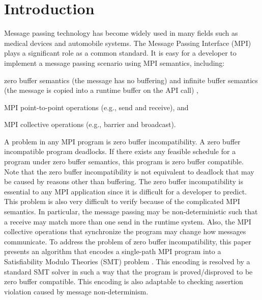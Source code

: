 \section{Introduction}
Message passing technology has become widely used in many fields such as medical devices and automobile systems. The Message Passing Interface (MPI) plays a significant role as a common standard. It is easy for a developer to implement a message passing scenario using MPI semantics, including:

\begin{compactitem}
\item zero buffer semantics (the message has no buffering) and infinite buffer semantics (the message is copied into a runtime buffer on the API call) \cite{DBLP:conf/fm/VakkalankaVGK09},
\item MPI point-to-point operations (e.g., send and receive), and
\item MPI collective operations (e.g., barrier and broadcast).
\end{compactitem}

A problem in any MPI program is zero buffer incompatibility. A zero buffer incompatible program deadlocks. If there exists any feasible schedule for a program under zero buffer semantics, this program is zero buffer compatible. Note that the zero buffer incompatibility is not equivalent to deadlock that may be caused by reasons other than buffering. The zero buffer incompatibility is essential to any MPI application since it is difficult for a developer to predict. 
This problem is also very difficult to verify because of the complicated MPI semantics.
In particular, the message passing may be non-deterministic such that a receive may match more than one send in the runtime system. Also, the MPI collective operations that synchronize the program may change how messages communicate. To address the problem of zero buffer incompatibility, this paper presents an algorithm that encodes a single-path MPI program into a Satisfiability Modulo Theories (SMT) problem \cite{barrett2008satisfiability}. This encoding is resolved by a standard SMT solver in such a way that the program is proved/disproved to be zero buffer compatible. This encoding is also adaptable to checking assertion violation caused by message non-determinism.

